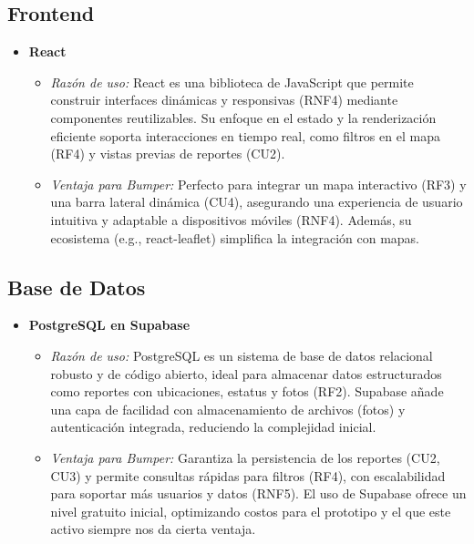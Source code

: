 \subsection*{Frontend}
\begin{itemize}
    \item \textbf{React}
    \begin{itemize}
        \item \textit{Razón de uso:} React es una biblioteca de JavaScript que permite construir interfaces dinámicas y responsivas (RNF4) mediante componentes reutilizables. Su enfoque en el estado y la renderización eficiente soporta interacciones en tiempo real, como filtros en el mapa (RF4) y vistas previas de reportes (CU2).
        \item \textit{Ventaja para Bumper:} Perfecto para integrar un mapa interactivo (RF3) y una barra lateral dinámica (CU4), asegurando una experiencia de usuario intuitiva y adaptable a dispositivos móviles (RNF4). Además, su ecosistema (e.g., react-leaflet) simplifica la integración con mapas.
    \end{itemize}
\end{itemize}

\subsection*{Base de Datos}
\begin{itemize}
    \item \textbf{PostgreSQL en Supabase}
    \begin{itemize}
        \item \textit{Razón de uso:} PostgreSQL es un sistema de base de datos relacional robusto y de código abierto, ideal para almacenar datos estructurados como reportes con ubicaciones, estatus y fotos (RF2). Supabase añade una capa de facilidad con almacenamiento de archivos (fotos) y autenticación integrada, reduciendo la complejidad inicial.
        \item \textit{Ventaja para Bumper:} Garantiza la persistencia de los reportes (CU2, CU3) y permite consultas rápidas para filtros (RF4), con escalabilidad para soportar más usuarios y datos (RNF5). El uso de Supabase ofrece un nivel gratuito inicial, optimizando costos para el prototipo y el que este activo siempre nos da cierta ventaja.
    \end{itemize}
\end{itemize}

